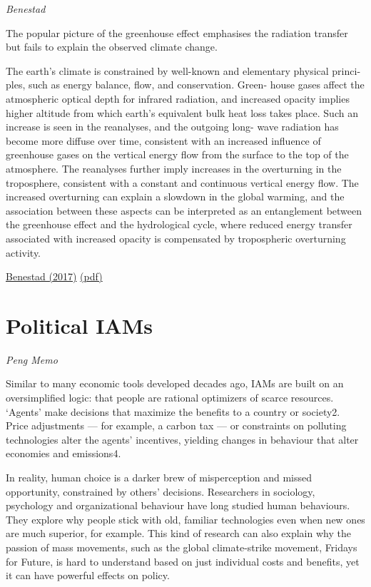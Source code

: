 \documentclass[
]{book}
\begin{document}
\emph{Benestad}

The popular picture of the greenhouse effect
emphasises the radiation transfer but fails to explain the
observed climate change.

The earth's climate is
constrained by well-known and elementary physical princi-
ples, such as energy balance, flow, and conservation. Green-
house gases affect the atmospheric optical depth for infrared
radiation, and increased opacity implies higher altitude from
which earth's equivalent bulk heat loss takes place. Such an
increase is seen in the reanalyses, and the outgoing long-
wave radiation has become more diffuse over time, consistent
with an increased influence of greenhouse gases on the
vertical energy flow from the surface to the top of the atmosphere.
The reanalyses further imply increases in the overturning
in the troposphere, consistent with a constant and
continuous vertical energy flow. The increased overturning
can explain a slowdown in the global warming, and the
association between these aspects can be interpreted as an
entanglement between the greenhouse effect and the hydrological cycle,
where reduced energy transfer associated with increased opacity
is compensated by tropospheric overturning activity.

\href{https://link.springer.com/article/10.1007/s00704-016-1732-y}{Benestad (2017)}
\href{pdf/Benestad_2017_Mental_Picture_of_Greenhouse_Effect.pdf}{(pdf)}

\hypertarget{political-iams}{%
\section{Political IAMs}\label{political-iams}}

\emph{Peng Memo}

Similar to many economic tools developed decades ago, IAMs are built on an oversimplified logic: that people are rational optimizers of scarce resources. `Agents' make decisions that maximize the benefits to a country or society2. Price adjustments --- for example, a carbon tax --- or constraints on polluting technologies alter the agents' incentives, yielding changes in behaviour that alter economies and emissions4.

In reality, human choice is a darker brew of misperception and missed opportunity, constrained by others' decisions. Researchers in sociology, psychology and organizational behaviour have long studied human behaviours. They explore why people stick with old, familiar technologies even when new ones are much superior, for example. This kind of research can also explain why the passion of mass movements, such as the global climate-strike movement, Fridays for Future, is hard to understand based on just individual costs and benefits, yet it can have powerful effects on policy.
\end{document}
